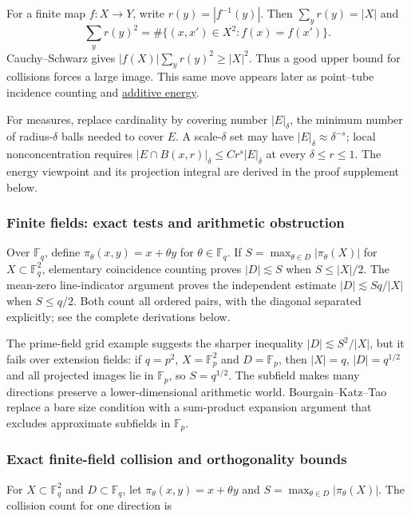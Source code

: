 For a finite map \(f:X\to Y\), write \(r(y)=|f^{-1}(y)|\). Then \(\sum_y r(y)=|X|\) and \[\sum_y r(y)^2=\#\{(x,x')\in X^2:f(x)=f(x')\}.\] Cauchy--Schwarz gives \(|f(X)|\sum_y r(y)^2\ge |X|^2\). Thus a good upper bound for collisions forces a large image. This same move appears later as point--tube incidence counting and \hyperref[appendix-b0732b22e7d6]{additive energy}.

For measures, replace cardinality by covering number \(|E|_\delta\), the minimum number of radius-\(\delta\) balls needed to cover \(E\). A scale-\(\delta\) set may have \(|E|_\delta\approx\delta^{-s}\); local nonconcentration requires \(|E\cap B(x,r)|_\delta\le Cr^s|E|_\delta\) at every \(\delta\le r\le1\). The energy viewpoint and its projection integral are derived in the proof supplement below.

\subsubsection{Finite fields: exact tests and arithmetic obstruction}\label{finite-fields-exact-tests-and-arithmetic-obstruction}

Over \(\mathbb F_q\), define \(\pi_\theta(x,y)=x+\theta y\) for \(\theta\in\mathbb F_q\). If \(S=\max_{\theta\in D}|\pi_\theta(X)|\) for \(X\subset\mathbb F_q^2\), elementary coincidence counting proves \(|D|\lesssim S\) when \(S\le|X|/2\). The mean-zero line-indicator argument proves the independent estimate \(|D|\lesssim Sq/|X|\) when \(S\le q/2\). Both count all ordered pairs, with the diagonal separated explicitly; see the complete derivations below.

The prime-field grid example suggests the sharper inequality \(|D|\lesssim S^2/|X|\), but it fails over extension fields: if \(q=p^2\), \(X=\mathbb F_p^2\) and \(D=\mathbb F_p\), then \(|X|=q\), \(|D|=q^{1/2}\) and all projected images lie in \(\mathbb F_p\), so \(S=q^{1/2}\). The subfield makes many directions preserve a lower-dimensional arithmetic world. Bourgain--Katz--Tao replace a bare size condition with a sum-product expansion argument that excludes approximate subfields in \(\mathbb F_p\).

\subsubsection{Exact finite-field collision and orthogonality bounds}\label{exact-finite-field-collision-and-orthogonality-bounds}

For \(X\subset\mathbb F_q^2\) and \(D\subset\mathbb F_q\), let \(\pi_\theta(x,y)=x+\theta y\) and \(S=\max_{\theta\in D}|\pi_\theta(X)|\). The collision count for one direction is

